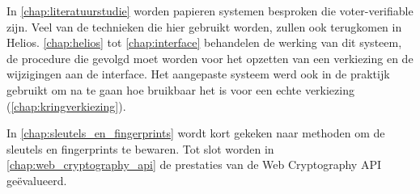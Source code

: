 \npar In \ref{chap:literatuurstudie} worden papieren systemen besproken die voter-verifiable zijn. Veel van de technieken die hier gebruikt worden, zullen ook terugkomen in Helios. \ref{chap:helios} tot \ref{chap:interface} behandelen de werking van dit systeem, de procedure die gevolgd moet worden voor het opzetten van een verkiezing en de wijzigingen aan de interface. Het aangepaste systeem werd ook in de praktijk gebruikt om na te gaan hoe bruikbaar het is voor een echte verkiezing (\ref{chap:kringverkiezing}). 

\npar In \ref{chap:sleutels_en_fingerprints} wordt kort gekeken naar methoden om de sleutels en fingerprints te bewaren. Tot slot worden in \ref{chap:web_cryptography_api} de prestaties van de Web Cryptography API ge\"evalueerd.
